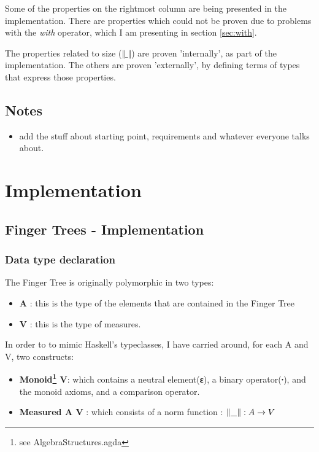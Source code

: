 \documentclass[12pt,twoside,notitlepage]{report}
\begin{document}
Some of the properties on the rightmost column are being presented in the implementation. There are properties which could not be proven due to problems with the \textit{with} operator, which I am presenting in section \ref{sec:with}.

The properties related to size ($\Vert\_\Vert$) are proven 'internally', as part of the implementation. The others are proven 'externally', by defining terms of types that express those properties. 

\section{Notes}

\begin{itemize}
\item add the stuff about starting point, requirements and whatever everyone talks about.
\end{itemize}

\chapter{Implementation}



\section{Finger Trees - Implementation}

\subsection{Data type declaration}

The Finger Tree is originally polymorphic in two types:
\begin{itemize}
\item \textbf{A} : this is the type of the elements that are contained in the Finger Tree 
\item \textbf{V} : this is the type of measures. 
\end{itemize} 


In order to to mimic Haskell's typeclasses, I have carried around, for each A and V, two constructs:

\begin{itemize} 
\item \textbf{Monoid\footnote{see AlgebraStructures.agda} V}: which contains a neutral element(\textbf{ε}), a binary operator(\textbf{∙}), and the monoid axioms, and a comparison operator.
\item \textbf{Measured A V} : which consists of a norm function  :  \textbf{$\Vert\_\Vert : \nolinebreak A \rightarrow V$}
\end{itemize} 
\end{document}
